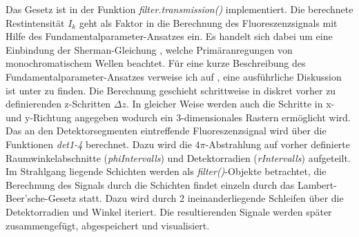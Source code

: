 Das Gesetz ist in der Funktion \textit{filter.transmission()} implementiert. Die berechnete Restintensität $I_{k}$ geht als Faktor in die Berechnung des Fluoreszenzsignals mit Hilfe des Fundamentalparameter-Ansatzes ein. Es handelt sich dabei um eine Einbindung der Sherman-Gleichung \cite{sherman}, welche Primäranregungen von monochromatischem Wellen beachtet. Für eine kurze Beschreibung des Fundamentalparameter-Ansatzes verweise ich auf \cite[S.~24ff]{hanna}, eine ausführliche Diskussion ist unter \cite[S.~350ff]{bbbook} zu finden. \newline
Die Berechnung geschieht schrittweise in diskret vorher zu definierenden z-Schritten $\Delta z$. In gleicher Weise werden auch die Schritte in x- und y-Richtung angegeben wodurch ein 3-dimensionales Rastern ermöglicht wird. \newline
Das an den Detektorsegmenten eintreffende Fluoreszenzsignal wird über die Funktionen \textit{det1-4} berechnet. Dazu wird die $4\pi$-Abstrahlung auf vorher definierte Raumwinkelabschnitte (\textit{phiIntervalls}) und Detektorradien (\textit{rIntervalls}) aufgeteilt. Im Strahlgang liegende Schichten werden als \textit{filter()}-Objekte betrachtet, die Berechnung des Signals durch die Schichten findet einzeln durch das Lambert-Beer'sche-Gesetz statt. Dazu wird durch 2 ineinanderliegende Schleifen über die Detektorradien und Winkel iteriert. Die resultierenden Signale werden später zusammengefügt, abgespeichert und visualisiert.\newline

